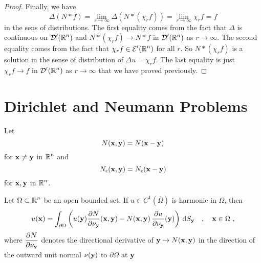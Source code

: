 \begin{proof}
Finally, we have
\[
\Delta (N\ast f) = \lim_{r\to \infty} \Delta (N \ast (\chi_r f))
= \lim_{r\to \infty} \chi_r f = f
\]
in the sens of distributions.  The first equality comes from the fact
that $\Delta$ is continuous on $\displaystyle \mathcal{D}'(\mathbb{R}^n)$ and
$N\ast (\chi_r f) \to N \ast f$ in $\displaystyle \mathcal{D}'(\mathbb{R}^n)$ as
$r \to \infty$.  The second equality comes from the fact that
$\displaystyle \chi_r f \in \mathcal{E}'(\mathbb{R}^n)$ for all $r$.
So $N \ast (\chi_r f)$ is a
solution in the sense of distribution of $\Delta u = \chi_r f$.
The last equality is just $\chi_r f \to f$ in
$\displaystyle \mathcal{D}'(\mathbb{R}^n)$ as $r\to \infty$ that we have proved previously.
\end{proof}

\section{Dirichlet and Neumann Problems}

Let
\begin{equation} \label{laplace_NXY}
N(\mathbf{x},\mathbf{y}) = N(\mathbf{x}-\mathbf{y})
\end{equation}
for $\mathbf{x}\neq \mathbf{y}$ in $\displaystyle \mathbb{R}^n$ and
\[
  N_\epsilon(\mathbf{x},\mathbf{y}) = N_\epsilon(\mathbf{x}-\mathbf{y})
\]
for $\mathbf{x},\mathbf{y}$ in $\displaystyle \mathbb{R}^n$.

\begin{theorem} \label{laplace_uhexp}
Let $\displaystyle \Omega \subset \mathbb{R}^n$ be an open bounded set.  If
$\displaystyle u\in C^1(\overline{\Omega})$ is harmonic in $\Omega$, then
\begin{equation} \label{laplace_pot3}
u(\mathbf{x}) = \int_{\partial \Omega} \left( u(\mathbf{y})
\frac{\partial{N}}{\partial \mathbf{\nu}_{\mathbf{y}}}(\mathbf{x},\mathbf{y}) -
N(\mathbf{x},\mathbf{y})\,\frac{\partial{u}}{\partial \mathbf{\nu}_{\mathbf{y}}}(\mathbf{y})\right)
\,\mathrm{d}{S}_{\mathbf{y}} \quad , \quad \mathbf{x} \in \Omega \ ,
\end{equation}
where $\displaystyle \frac{\partial{N}}{\partial \mathbf{\nu}_{\mathbf{y}}}$ denotes the
directional derivative of $\mathbf{y} \mapsto N(\mathbf{x},\mathbf{y})$ in the
direction of the outward unit normal $\mathbf{\nu}(\mathbf{y})$ to
$\partial \Omega$ at $\mathbf{y}$
\end{theorem}

